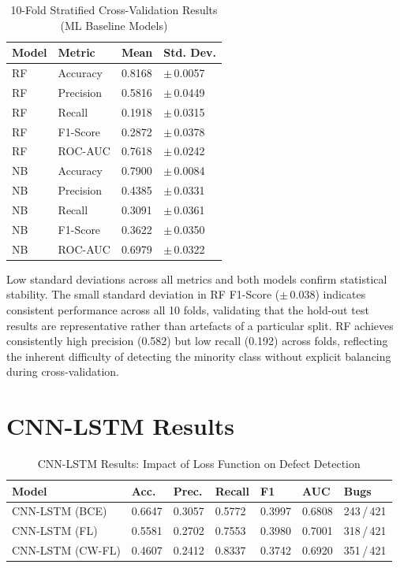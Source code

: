 \documentclass[12pt,a4paper,oneside]{report}
\begin{document}
\begin{table}[H]
  \centering
  \caption{10-Fold Stratified Cross-Validation Results (ML Baseline Models)}
  \label{tab:cv_results}
  \begin{tabular}{L{15mm}L{18mm}C{25mm}C{25mm}}
    \toprule
    \textbf{Model} & \textbf{Metric} & \textbf{Mean} & \textbf{Std. Dev.} \\
    \midrule
    RF  & Accuracy  & 0.8168 & $\pm$\,0.0057 \\
    RF  & Precision & 0.5816 & $\pm$\,0.0449 \\
    RF  & Recall    & 0.1918 & $\pm$\,0.0315 \\
    RF  & F1-Score  & 0.2872 & $\pm$\,0.0378 \\
    RF  & ROC-AUC   & 0.7618 & $\pm$\,0.0242 \\
    \midrule
    NB  & Accuracy  & 0.7900 & $\pm$\,0.0084 \\
    NB  & Precision & 0.4385 & $\pm$\,0.0331 \\
    NB  & Recall    & 0.3091 & $\pm$\,0.0361 \\
    NB  & F1-Score  & 0.3622 & $\pm$\,0.0350 \\
    NB  & ROC-AUC   & 0.6979 & $\pm$\,0.0322 \\
    \bottomrule
  \end{tabular}
\end{table}

Low standard deviations across all metrics and both models confirm statistical stability. The small standard deviation in RF F1-Score ($\pm$\,0.038) indicates consistent performance across all 10 folds, validating that the hold-out test results are representative rather than artefacts of a particular split. RF achieves consistently high precision (0.582) but low recall (0.192) across folds, reflecting the inherent difficulty of detecting the minority class without explicit balancing during cross-validation.

\section{CNN-LSTM Results}

\begin{table}[H]
  \centering
  \caption{CNN-LSTM Results: Impact of Loss Function on Defect Detection}
  \label{tab:cnnlstm_results}
  \begin{tabular}{L{48mm}C{18mm}C{18mm}C{18mm}C{18mm}C{18mm}C{18mm}}
    \toprule
    \textbf{Model} & \textbf{Acc.} & \textbf{Prec.} & \textbf{Recall} & \textbf{F1} & \textbf{AUC} & \textbf{Bugs} \\
    \midrule
    CNN-LSTM (BCE)    & 0.6647 & 0.3057 & 0.5772 & 0.3997 & 0.6808 & 243\,/\,421 \\
    CNN-LSTM (FL)     & 0.5581 & 0.2702 & 0.7553 & 0.3980 & 0.7001 & 318\,/\,421 \\
    CNN-LSTM (CW-FL)  & 0.4607 & 0.2412 & 0.8337 & 0.3742 & 0.6920 & 351\,/\,421 \\
    \bottomrule
  \end{tabular}
\end{table}
\end{document}
